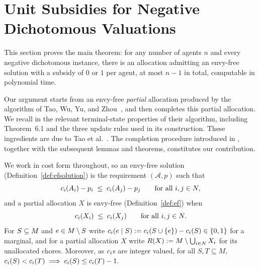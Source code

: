 \section{Unit Subsidies for Negative Dichotomous Valuations}
\label{sec:main}

This section proves the main theorem: for any number of agents $n$ and every
negative dichotomous instance, there is an allocation admitting an envy-free
solution with a subsidy of $0$ or $1$ per agent, at most $n-1$ in total, computable in polynomial time. 


Our argument starts from an envy-free \emph{partial} allocation produced by the algorithm of Tao, Wu, Yu, and Zhou~\cite{tao2025existence}, and then completes this partial allocation. We recall in  the relevant terminal-state properties of their algorithm, including Theorem~6.1 and the three update rules used in its construction. These ingredients are due to Tao et al.~\cite{tao2025existence}. The completion procedure introduced in , together with the subsequent lemmas and theorems, constitutes our contribution.



We work in cost form throughout, so an envy-free solution
(Definition~\ref{def:efsolution}) is the requirement $(\mathcal{A},p)$ such that
\begin{equation}
\label{eq:m-ef}
  c_i(A_{i}) - p_i \;\le\; c_i(A_{j}) - p_j
  \qquad \text{for all } i,j \in N ,
\end{equation}
and a partial allocation $X$ is envy-free (Definition~\ref{def:ef}) when
\begin{equation}
\label{eq:m-pef}
  c_i(X_i) \;\le\; c_i(X_j)
  \qquad \text{for all } i,j \in N .
\end{equation}
For $S \subseteq M$ and $e \in M \setminus S$ write
$c_i(e \mid S) := c_i(S \cup \left\{e\right\}) - c_i(S) \in \left\{0,1\right\}$ for a
marginal, and for a partial allocation $X$ write
$R(X) := M \setminus \bigcup_{i \in N} X_i$ for its unallocated chores.
 Moreover, as $c_i$s are integer valued, for all $S,T\subseteq M$, \(c_i(S) < c_i(T) \implies c_i(S) \le c_i(T) - 1 .
 \)


